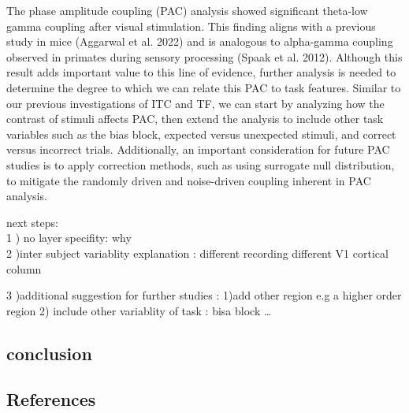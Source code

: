\documentclass[
  letterpaper,
  DIV=11,
  numbers=noendperiod]{scrartcl}
\begin{document}
The phase amplitude coupling (PAC) analysis showed significant theta-low
gamma coupling after visual stimulation. This finding aligns with a
previous study in mice (Aggarwal et al. 2022) and is analogous to
alpha-gamma coupling observed in primates during sensory processing
(Spaak et al. 2012). Although this result adds important value to this
line of evidence, further analysis is needed to determine the degree to
which we can relate this PAC to task features. Similar to our previous
investigations of ITC and TF, we can start by analyzing how the contrast
of stimuli affects PAC, then extend the analysis to include other task
variables such as the bias block, expected versus unexpected stimuli,
and correct versus incorrect trials. Additionally, an important
consideration for future PAC studies is to apply correction methods,
such as using surrogate null distribution, to mitigate the randomly
driven and noise-driven coupling inherent in PAC analysis.

next steps:\\
1 ) no layer specifity: why\\
2 )inter subject variablity explanation : different recording different
V1 cortical column

3 )additional suggestion for further studies : 1)add other region e.g a
higher order region 2) include other variablity of task : bisa block
\ldots{}

\subsection{conclusion}\label{conclusion}

\subsection{References}\label{references}
\end{document}
